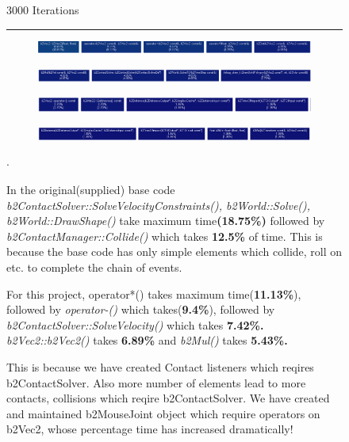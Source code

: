 \documentclass{report}
\begin{document}
\begin{figure}
\Large \begin{center}3000 Iterations \hrule \end{center}
\begin{subfigure}[h]{\textwidth}
\includegraphics[width=\textwidth, height=0.1\textwidth]{gprof/500_1.png}
\caption{}
\end{subfigure}
\begin{subfigure}[h]{\textwidth}
\includegraphics[width=\textwidth, height=0.1\textwidth]{gprof/500_2.png}
\caption{}
\end{subfigure}
\begin{subfigure}[h]{\textwidth}
\includegraphics[width=\textwidth, height=0.1\textwidth]{gprof/500_3.png}
\caption{}
\end{subfigure}
\begin{subfigure}[h]{\textwidth}
\includegraphics[width=\textwidth, height=0.1\textwidth]{gprof/500_4.png}
\caption{}
\end{subfigure}
\begin{list}{$\cdot$}{}
\item In the original(supplied) base code \emph{b2ContactSolver::SolveVelocityConstraints(), b2World::Solve(), b2World::DrawShape() } take maximum time\textbf{(18.75\%)} followed by \emph{b2ContactManager::Collide()} which takes \textbf{12.5\%} of time. This is because the base code has only simple elements which collide, roll on etc. to complete the chain of events.
\item For this project, operator*() takes maximum time(\textbf{11.13\%}), followed by \emph{operator-()} which takes(\textbf{9.4\%}), followed by \emph{b2ContactSolver::SolveVelocity()} which takes \textbf{7.42\%.} \emph{b2Vec2::b2Vec2()} takes \textbf{6.89\%} and \emph{b2Mul()} takes \textbf{5.43\%.}
\item This is because we have created Contact listeners which reqires b2ContactSolver. Also more number of elements lead to more contacts, collisions which reqire b2ContactSolver. We have created and maintained b2MouseJoint object which require operators on b2Vec2, whose percentage time has increased dramatically! 
\item 
\end{list}
\end{figure}

\pagebreak




\end{document}
